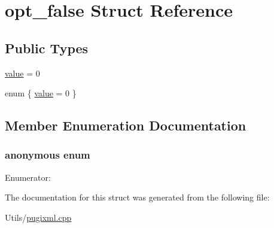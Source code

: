 \hypertarget{structopt__false}{
\section{opt\_\-false Struct Reference}
\label{structopt__false}
}
\subsection*{Public Types}
\begin{CompactItemize}
\item 
\hyperlink{structopt__false_ec8aafd36c3d9b13a329712e6fbb2e4d0608b30b4b0f63ec3263f29fe847899e}{value} = 0
\item 
enum \{ \hyperlink{structopt__false_ec8aafd36c3d9b13a329712e6fbb2e4d0608b30b4b0f63ec3263f29fe847899e}{value} =  0
 \}
\end{CompactItemize}


\subsection{Member Enumeration Documentation}
\hypertarget{structopt__false_ec8aafd36c3d9b13a329712e6fbb2e4d}{
\subsubsection["@2]{\setlength{\rightskip}{0pt plus 5cm}anonymous enum}}
\label{structopt__false_ec8aafd36c3d9b13a329712e6fbb2e4d}


\begin{Desc}
\item[Enumerator: ]\par
\begin{description}
\item[{\em 
\hypertarget{structopt__false_ec8aafd36c3d9b13a329712e6fbb2e4d0608b30b4b0f63ec3263f29fe847899e}{
value}
\label{structopt__false_ec8aafd36c3d9b13a329712e6fbb2e4d0608b30b4b0f63ec3263f29fe847899e}
}]\end{description}
\end{Desc}



The documentation for this struct was generated from the following file:\begin{CompactItemize}
\item 
Utils/\hyperlink{pugixml_8cpp}{pugixml.cpp}\end{CompactItemize}
